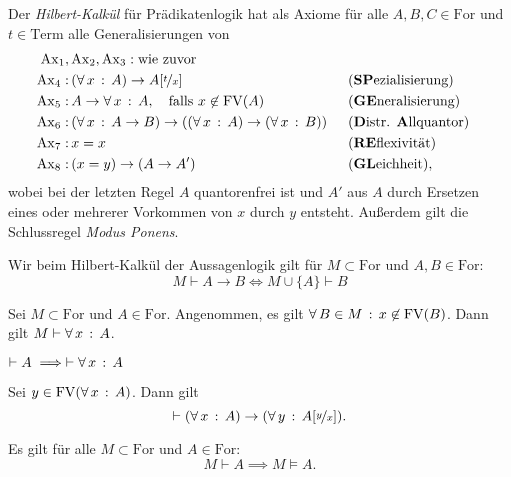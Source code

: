 \documentclass{cheat-sheet}
\newcommand{\Term}{\mathrm{Term}} %
\newcommand{\For}{\mathrm{For}} %
\newcommand{\Ax}{\mathrm{Ax}} %
\newcommand{\FV}{\mathrm{FV}} %
\newcommand{\subst}[2]{\nicefrac{#1}{#2}} %
\begin{document}
\begin{defn}
  Der \emph{Hilbert-Kalkül} für Prädikatenlogik hat als Axiome für alle $A, B, C \in \For$ und $t \in \Term$ alle Generalisierungen von
  \begin{alignat*}{3}
    \Ax_1,\,&\Ax_2,\Ax_3 : \text{wie zuvor}\\
    \Ax_4 :\, & (\fa{x} A) \to A[\subst{t}{x}] && \text{(\textbf{SP}ezialisierung)}\\
    \Ax_5 :\, & A \to \fa{x} A, \quad \text{falls $x \not\in \FV(A)$} && \text{(\textbf{GE}neralisierung)}\\
    \Ax_6 :\, & (\fa{x} A \to B) \to ((\fa{x} A) \to (\fa{x} B)) \enspace && \text{(\textbf{D}istr. \textbf{A}llquantor)}\\
    \Ax_7 :\, & x = x && \text{(\textbf{RE}flexivität)}\\
    \Ax_8 :\, & (x = y) \to (A \to A') && \text{(\textbf{GL}eichheit)},
  \end{alignat*}
  wobei bei der letzten Regel $A$ quantorenfrei ist und $A'$ aus $A$ durch Ersetzen eines oder mehrerer Vorkommen von $x$ durch $y$ entsteht. Außerdem gilt die Schlussregel \emph{Modus Ponens}.
\end{defn}


\begin{satz}[Deduktionstheorem]
  Wir beim Hilbert-Kalkül der Aussagenlogik gilt für $M \subset \For$ und $A, B \in \For$:
  \[ M \vdash A \to B \iff M \cup \{ A \} \vdash B \]
\end{satz}

\begin{satz}[Generalisierungstheorem]
  Sei $M \subset \For$ und $A \in \For$. Angenommen, es gilt $\fa{B \in M} x \not\in \FV(B)$. Dann gilt $M \vdash \forall \, {x} \,:\, A$.
\end{satz}

\begin{kor}
  $\vdash A \implies \vdash \forall \, {x} \,:\, A$
\end{kor}

\begin{prop}
  Sei $y \in \FV(\fa{x} A)$. Dann gilt
  \[ \vdash (\fa{x} A) \to (\fa{y} A[\subst{y}{x}]). \]
\end{prop}


\begin{satz}[Korrektheit]
  Es gilt für alle $M \subset \For$ und $A \in \For$:
  \[ M \vdash A \implies M \models A. \]
\end{satz}
\end{document}
